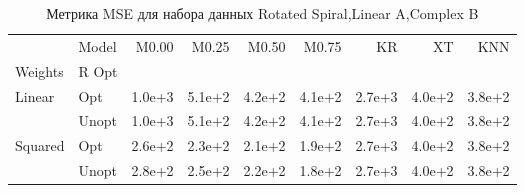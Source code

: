\begin{table}
\caption{Метрика MSE для набора данных Rotated Spiral,Linear A,Complex B}
\label{tab:MSE_Rotated Spiral,Linear A,Complex B}
\begin{tabular}{llrrrrrrr}
\toprule
 & Model & M0.00 & M0.25 & M0.50 & M0.75 & KR & XT & KNN \\
Weights & R Opt &  &  &  &  &  &  &  \\
\midrule
\multirow[t]{2}{*}{Linear} & Opt & 1.0e+3 & 5.1e+2 & 4.2e+2 & 4.1e+2 & 2.7e+3 & 4.0e+2 & 3.8e+2 \\
 & Unopt & 1.0e+3 & 5.1e+2 & 4.2e+2 & 4.1e+2 & 2.7e+3 & 4.0e+2 & 3.8e+2 \\

\multirow[t]{2}{*}{Squared} & Opt & 2.6e+2 & 2.3e+2 & 2.1e+2 & 1.9e+2 & 2.7e+3 & 4.0e+2 & 3.8e+2 \\
 & Unopt & 2.8e+2 & 2.5e+2 & 2.2e+2 & 1.8e+2 & 2.7e+3 & 4.0e+2 & 3.8e+2 \\

\bottomrule
\end{tabular}
\end{table}
